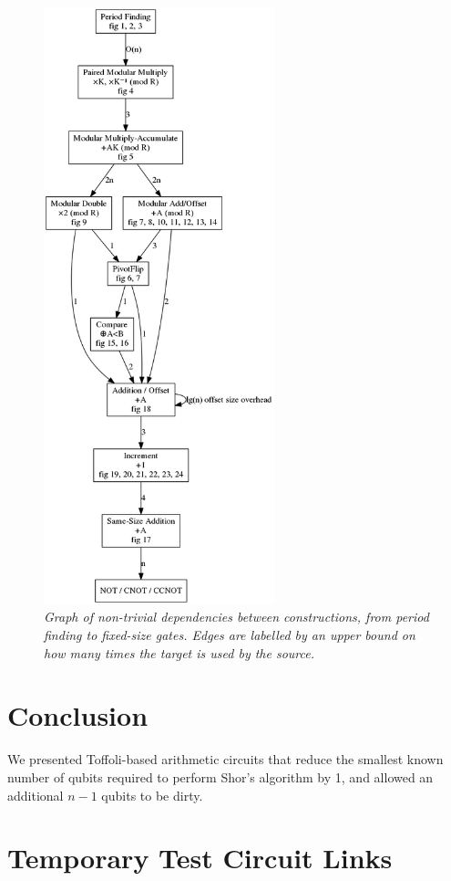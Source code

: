 \documentclass[twocolumn]{article}
\begin{document}
\begin{figure}
  \centering
  \includegraphics[height=17.3cm]{assets/dependencies.png}
  \caption{\em
    Graph of non-trivial dependencies between constructions, from period finding to fixed-size gates.
    Edges are labelled by an upper bound on how many times the target is used by the source.
  }
  \label{fig:dependencies}
\end{figure}


\section{Conclusion} \label{sec:conclusion}

We presented Toffoli-based arithmetic circuits that reduce the smallest known number of qubits required to perform Shor's algorithm by 1, and allowed an additional $n-1$ qubits to be dirty.




\section{Temporary Test Circuit Links}
\end{document}
